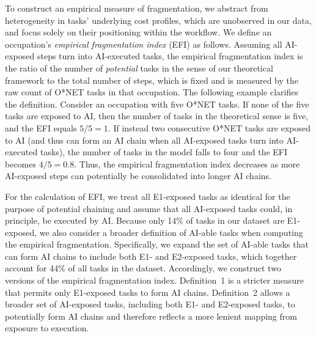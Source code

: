 To construct an empirical measure of fragmentation, we abstract from heterogeneity in tasks' underlying cost profiles, which are unobserved in our data, and focus solely on their positioning within the workflow.  
We define an occupation's \emph{empirical fragmentation index} (EFI) as follows.
Assuming all AI-exposed steps turn into AI-executed tasks, the empirical fragmentation index is the ratio of the number of \emph{potential} tasks in the sense of our theoretical framework to the total number of steps, which is fixed and is measured by the raw count of O*NET tasks in that occupation.
The following example clarifies the definition.  
Consider an occupation with five O*NET tasks.  
If none of the five tasks are exposed to AI, then the number of tasks in the theoretical sense is five, and the EFI equals $5/5 = 1$.  
If instead two consecutive O*NET tasks are exposed to AI (and thus can form an AI chain when all AI-exposed tasks turn into AI-executed tasks), the number of tasks in the model falls to four and the EFI becomes $4/5 = 0.8$.  
Thus, the empirical fragmentation index decreases as more AI-exposed steps can potentially be consolidated into longer AI chains.   

For the calculation of EFI, we treat all E1-exposed tasks as identical for the purpose of potential chaining and assume that all AI-exposed tasks could, in principle, be executed by AI.  
Because only 14\% of tasks in our dataset are E1-exposed, we also consider a broader definition of AI-able tasks when computing the empirical fragmentation.  
Specifically, we expand the set of AI-able tasks that can form AI chains to include both E1- and E2-exposed tasks, which together account for 44\% of all tasks in the dataset.  
Accordingly, we construct two versions of the empirical fragmentation index.  
Definition~1 is a stricter measure that permits only E1-exposed tasks to form AI chains.  
Definition~2 allows a broader set of AI-exposed tasks, including both E1- and E2-exposed tasks, to potentially form AI chains and therefore reflects a more lenient mapping from exposure to execution.  

